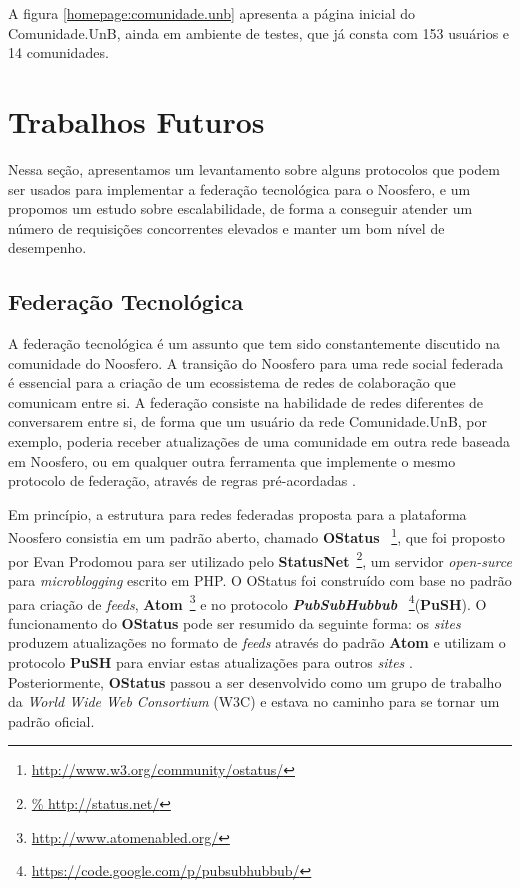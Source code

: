A figura \ref{homepage:comunidade.unb} apresenta a página inicial do
Comunidade.UnB, ainda em ambiente de testes, que já consta com 153 usuários
e 14 comunidades.

\section{Trabalhos Futuros}

Nessa seção, apresentamos um levantamento sobre alguns protocolos que
podem ser usados para implementar a federação tecnológica para o Noosfero, e
um propomos um estudo sobre escalabilidade, de forma a conseguir atender
um número de requisições concorrentes elevados e manter um bom nível de
desempenho.

\subsection{Federação Tecnológica}

A federação tecnológica é um assunto que tem sido constantemente discutido
na comunidade do Noosfero. A transição do Noosfero para uma rede social federada
é essencial para a criação de um ecossistema de redes de colaboração que
comunicam entre si.
%
A federação consiste na habilidade de redes diferentes de conversarem entre si,
de forma que um usuário da rede Comunidade.UnB, por exemplo, poderia receber
atualizações de uma comunidade em outra rede baseada em Noosfero, ou em
qualquer outra ferramenta que implemente o mesmo protocolo de federação,
através de regras pré-acordadas \cite{prodomou2010}.

Em princípio, a estrutura para redes federadas proposta para a plataforma Noosfero
consistia em um padrão aberto, chamado \textbf{OStatus}
~\footnote{\url{http://www.w3.org/community/ostatus/}}, que foi proposto
por Evan Prodomou para ser utilizado pelo \textbf{StatusNet}~\footnote{\url{%
http://status.net/}}, um servidor  \textit{open-surce} para
\textit{microblogging} escrito em PHP.
%
O OStatus foi construído com base no padrão para criação de \textit{feeds},
\textbf{Atom}~\footnote{\url{http://www.atomenabled.org/}} e no
protocolo \textbf{\textit{PubSubHubbub}}%
~\footnote{\url{https://code.google.com/p/pubsubhubbub/}}(\textbf{PuSH}).
%
O funcionamento do \textbf{OStatus} pode ser resumido da seguinte forma:
os \textit{sites} produzem atualizações no formato de \textit{feeds} através
do padrão \textbf{Atom} e utilizam o protocolo \textbf{PuSH}
para enviar estas atualizações para outros \textit{sites} \cite{OStatusBasics}.
%
Posteriormente, \textbf{OStatus} passou a ser desenvolvido como um
grupo de trabalho da \textit{World Wide Web Consortium} (W3C) e estava no
caminho para se tornar um padrão oficial.

